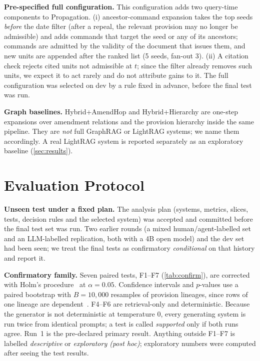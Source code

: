 \documentclass[sigconf,anonymous,review]{acmart}
\newcommand{\sys}[1]{\textsf{#1}}
\begin{document}
\textbf{Pre-specified full configuration.} This configuration adds two query-time components to \sys{Propagation}. (i) ancestor-command expansion takes the top seeds \emph{before} the date filter (after a repeal, the relevant provision may no longer be admissible) and adds commands that target the seed or any of its ancestors; commands are admitted by the validity of the document that issues them, and new units are appended after the ranked list (5 seeds, fan-out 3). (ii) A citation check rejects cited units not admissible at $t$; since the filter already removes such units, we expect it to act rarely and do not attribute gains to it. The full configuration was selected on dev by a rule fixed in advance, before the final test was run.

\begin{sloppypar}
\textbf{Graph baselines.} \sys{Hybrid+\allowbreak AmendHop} and \sys{Hybrid+\allowbreak Hierarchy} are one-step expansions over amendment relations and the provision hierarchy inside the same pipeline. They are \emph{not} full GraphRAG or LightRAG systems; we name them accordingly. A real LightRAG system is reported separately as an exploratory baseline (\cref{sec:results}).
\end{sloppypar}

\section{Evaluation Protocol}
\label{sec:protocol}

\textbf{Unseen test under a fixed plan.} The analysis plan (systems, metrics, slices, tests, decision rules and the selected system) was accepted and committed before the final test set was run. Two earlier rounds (a mixed human/agent-labelled set and an LLM-labelled replication, both with a 4B open model) and the dev set had been seen; we treat the final tests as confirmatory \emph{conditional} on that history and report it.

\textbf{Confirmatory family.} Seven paired tests, F1--F7 (\cref{tab:confirm}), are corrected with Holm's procedure~\cite{holm1979} at $\alpha=0.05$. Confidence intervals and $p$-values use a paired bootstrap with $B=10{,}000$ resamples of provision lineages, since rows of one lineage are dependent~\cite{dror2018hitchhiker}. F4--F6 are retrieval-only and deterministic. Because the generator is not deterministic at temperature 0, every generating system is run twice from identical prompts; a test is called \emph{supported} only if both runs agree. Run~1 is the pre-declared primary result. Anything outside F1--F7 is labelled \emph{descriptive} or \emph{exploratory (post hoc)}; exploratory numbers were computed after seeing the test results.
\end{document}

